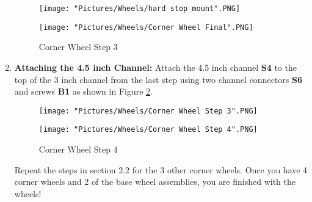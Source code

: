 \documentclass[12pt]{article}
\begin{document}
\begin{enumerate}
\begin{figure}[H]
  \centering
  \begin{minipage}[b]{0.45\textwidth}
    \texttt{[image: "Pictures/Wheels/hard stop mount".PNG]}
  \end{minipage}
  \hfill
  \begin{minipage}[b]{0.45\textwidth}
    \texttt{[image: "Pictures/Wheels/Corner Wheel Final".PNG]}
  \end{minipage}
  \caption{Corner Wheel Step 3}
  \label{corner wheel step 3}
\end{figure}


\item \textbf{Attaching the 4.5 inch Channel:} Attach the 4.5 inch channel \textbf{S4} to the top of the 3 inch channel from the last step using two channel connectors \textbf{S6} and screws \textbf{B1} as shown in Figure \ref{corner wheel step 4}.

\begin{figure}[H]
  \centering
  \begin{minipage}[b]{0.45\textwidth}
    \texttt{[image: "Pictures/Wheels/Corner Wheel Step 3".PNG]}
  \end{minipage}
  \hfill
  \begin{minipage}[b]{0.45\textwidth}
    \texttt{[image: "Pictures/Wheels/Corner Wheel Step 4".PNG]}
  \end{minipage}
  \caption{Corner Wheel Step 4}
  \label{corner wheel step 4}
\end{figure}

Repeat the steps in section 2.2 for the 3 other corner wheels.  Once you have 4 corner wheels and 2 of the base wheel assemblies, you are finished with the wheels!

\end{enumerate}
\end{document}
